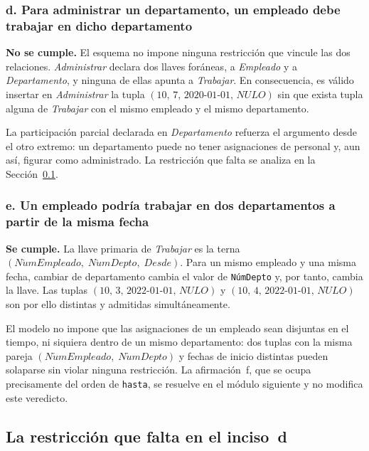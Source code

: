 \subsubsection*{d. Para administrar un departamento, un empleado debe trabajar en dicho departamento}

\textbf{No se cumple.} El esquema no impone ninguna restricción que vincule
las dos relaciones. \emph{Administrar} declara dos llaves foráneas, a
\emph{Empleado} y a \emph{Departamento}, y ninguna de ellas apunta a
\emph{Trabajar}. En consecuencia, es válido insertar en \emph{Administrar} la
tupla $(10,\, 7,\, 2020\text{-}01\text{-}01,\, \mathit{NULO})$ sin que exista
tupla alguna de \emph{Trabajar} con el mismo empleado y el mismo departamento.

La participación parcial declarada en \emph{Departamento} refuerza el
argumento desde el otro extremo: un departamento puede no tener asignaciones
de personal y, aun así, figurar como administrado. La restricción que falta se
analiza en la Sección~\ref{sec:restriccion-faltante}.

\subsubsection*{e. Un empleado podría trabajar en dos departamentos a partir de la misma fecha}

\textbf{Se cumple.} La llave primaria de \emph{Trabajar} es la terna
$(\mathit{N\acute{u}mEmpleado},\; \mathit{N\acute{u}mDepto},\;
\mathit{Desde})$. Para un mismo empleado y una misma fecha, cambiar de
departamento cambia el valor de \texttt{NúmDepto} y, por tanto, cambia la
llave. Las tuplas $(10,\, 3,\, 2022\text{-}01\text{-}01,\, \mathit{NULO})$ y
$(10,\, 4,\, 2022\text{-}01\text{-}01,\, \mathit{NULO})$ son por ello
distintas y admitidas simultáneamente.

El modelo no impone que las asignaciones de un empleado sean disjuntas en el
tiempo, ni siquiera dentro de un mismo departamento: dos tuplas con la misma
pareja $(\mathit{N\acute{u}mEmpleado},\; \mathit{N\acute{u}mDepto})$ y fechas
de inicio distintas pueden solaparse sin violar ninguna restricción. La
afirmación~f, que se ocupa precisamente del orden de \texttt{hasta}, se
resuelve en el módulo siguiente y no modifica este veredicto.

\subsection{La restricción que falta en el inciso~d}
\label{sec:restriccion-faltante}

